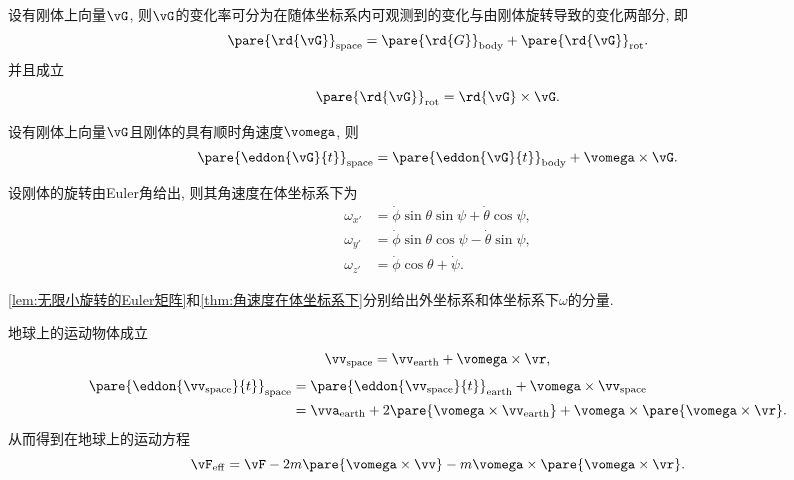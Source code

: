 \documentclass[../TheoreticalMechanics.tex]{subfiles}
\begin{document}
\begin{lemma}[刚体上向量的变化率]
    设有刚体上向量$\vG$, 则$\vG$的变化率可分为在随体坐标系内可观测到的变化与由刚体旋转导致的变化两部分, 即
    \[ \pare{\rd{\vG}}_{\mathrm{space}} = \pare{\rd{G}}_{\mathrm{body}} + \pare{\rd{\vG}}_{\mathrm{rot}}. \]
    并且成立
    \[ \pare{\rd{\vG}}_{\mathrm{rot}} = \rd{\vG}\times\vG. \]
\end{lemma}
\begin{finale}
    \begin{theorem}[随体导数]
        设有刚体上向量$\vG$且刚体的具有顺时角速度$\vomega$, 则
        \begin{equation}
            \label{eq:刚体随体导数}
            \pare{\eddon{\vG}{t}}_{\mathrm{space}} = \pare{\eddon{\vG}{t}}_{\mathrm{body}} + \vomega\times\vG.
        \end{equation}
    \end{theorem}
\end{finale}
\begin{theorem}[角速度在体坐标系下]
    \label{thm:角速度在体坐标系下}
    设刚体的旋转由Euler角给出, 则其角速度在体坐标系下为
    \begin{align*}
        \omega_{x'} &= \dot{\phi}\sin\theta\sin\psi + \dot{\theta}\cos\psi,\\
        \omega_{y'} &= \dot{\phi}\sin\theta\cos\psi - \dot{\theta}\sin\psi,\\
        \omega_{z'} &= \dot{\phi}\cos\theta + \dot{\psi}.
    \end{align*}
\end{theorem}
\begin{pitfall}
    \cref{lem:无限小旋转的Euler矩阵}和\cref{thm:角速度在体坐标系下}分别给出外坐标系和体坐标系下$\omega$的分量.
\end{pitfall}
\begin{ex}[Coriolis效应]
    地球上的运动物体成立
    \[ \vv_{\mathrm{space}} = \vv_{\mathrm{earth}} + \vomega\times\vr, \]
    \begin{align*}
        \pare{\eddon{\vv_{\mathrm{space}}}{t}}_{\mathrm{space}} &= \pare{\eddon{\vv_{\mathrm{space}}}{t}}_{\mathrm{earth}} + \vomega\times\vv_{\mathrm{space}}\\
        &= \vva_{\mathrm{earth}} + 2\pare{\vomega\times\vv_{\mathrm{earth}}} + \vomega\times\pare{\vomega\times\vr}.
    \end{align*}
    从而得到在地球上的运动方程
    \[ \vF_{\mathrm{eff}} = \vF - 2m\pare{\vomega\times\vv} - m\vomega\times\pare{\vomega\times\vr}. \]
\end{ex}
\end{document}
